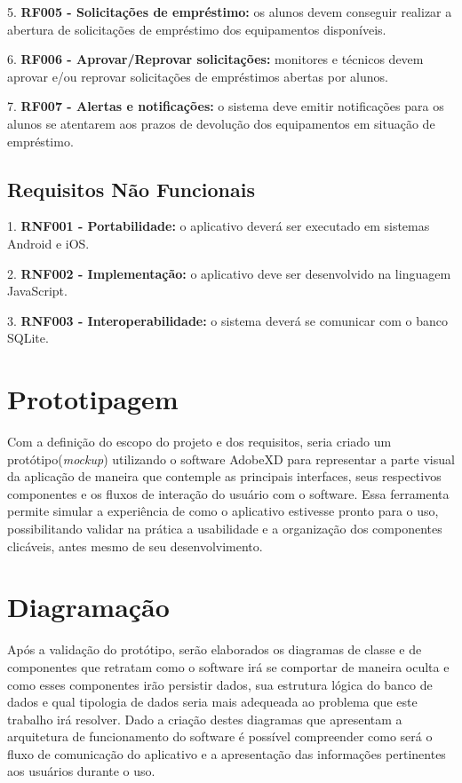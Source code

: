    5. \textbf{RF005 - Solicitações de empréstimo:} os alunos devem conseguir realizar a abertura de solicitações de empréstimo dos equipamentos disponíveis.
    
    6. \textbf{RF006 - Aprovar/Reprovar solicitações:} monitores e técnicos devem aprovar e/ou reprovar solicitações de empréstimos abertas por alunos.
    
    7. \textbf{RF007 - Alertas e notificações:} o sistema deve emitir notificações para os alunos se atentarem aos prazos de devolução dos equipamentos em situação de empréstimo.
    
    \subsection{Requisitos Não Funcionais}
    
    1. \textbf{RNF001 - Portabilidade:} o aplicativo deverá ser executado em sistemas Android e iOS.
    
    2. \textbf{RNF002 - Implementação:} o aplicativo deve ser desenvolvido na linguagem JavaScript.
    
    3. \textbf{RNF003 - Interoperabilidade:} o sistema deverá se comunicar com o banco SQLite.
    
    
    \section{Prototipagem}
    
    Com a definição do escopo do projeto e dos requisitos, seria criado um protótipo(\textit{mockup}) utilizando o software AdobeXD para representar a parte visual da aplicação de maneira que contemple as principais interfaces, seus respectivos componentes e os fluxos de interação do usuário com o software. Essa ferramenta permite simular a experiência de como o aplicativo estivesse pronto para o uso, possibilitando validar na prática a usabilidade e a organização dos componentes clicáveis, antes mesmo de seu desenvolvimento.
    
    
    \section{Diagramação}
    
    Após a validação do protótipo, serão elaborados os diagramas de classe e de componentes que retratam como o software irá se comportar de maneira oculta e como esses componentes irão persistir dados, sua estrutura lógica do banco de dados e qual tipologia de dados seria mais adequeada ao problema que este trabalho irá resolver. Dado a criação destes diagramas que apresentam a arquitetura de funcionamento do software é possível compreender como será o fluxo de comunicação do aplicativo e a apresentação das informações pertinentes aos usuários durante o uso. 
    
